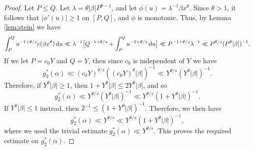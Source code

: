 \documentclass[11pt,reqno]{amsart}
\numberwithin{equation}{section}
\renewcommand{\d}{\,{\rm d}}
\begin{document}
\begin{proof} Let $P \leq Q$. Let $\lambda = \theta |\beta|P^{\theta-1}$, and let $\phi(u) = \lambda^{-1}\beta x^{\theta}$. Since $\theta > 1$, it follows that $|\phi'(u)|\geq 1$ on $[P,Q]$, and $\phi$ is monotonic. Thus, by Lemma \ref{lem:stein} we have 
\begin{align} \label{eq:osc}
\int_P^Q u^{-1+\theta/s}e(\beta x^{\theta})\d u \ll \lambda^{-1}\big[ Q^{-1+\theta/s}+\int_P^Q u^{-2+\theta/s}\d u \big] \ll P^{-1+\theta/s}\lambda^{-1} \ll P^{\theta/s}(P^{\theta}|\beta|)^{-1}. 
\end{align}
If we let $P = c_0Y$ and $Q = Y$, then since $c_0$ is independent of $Y$ we have 
\[ g_2^*(\alpha) \ll (c_0Y)^{\theta/s}((c_0Y)^{\theta}|\beta|)^{-1} \ll Y^{\theta/s}(Y^{\theta}|\beta|)^{-1}. \]
Therefore, if $Y^{\theta}|\beta| \geq 1$, then $1+Y^{\theta}|\beta| \leq 2Y^{\theta}|\beta|$, and so 
\[ g_2^*(\alpha) \ll Y^{\theta/s}(Y^{\theta}|\beta|)^{-1} \ll Y^{\theta/s}(1+Y^{\theta}|\beta|)^{-1}. \]
If $Y^{\theta}|\beta| \leq 1$ instead, then $2^{-1} \leq (1+Y^{\theta}|\beta|)^{-1}$. Therefore, we then have 
\[ g_2^*(\alpha) \ll Y^{\theta/s} \ll Y^{\theta/s}(1+Y^{\theta}|\beta|)^{-1}, \]
where we used the trivial estimate $g_2^*(\alpha) \ll Y^{\theta/s}$. This proves the required estimate on $g_2^*(\alpha)$. 


\end{proof}
\end{document}

